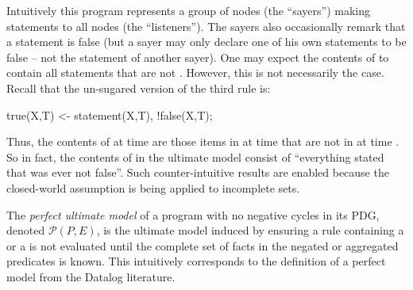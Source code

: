 Intuitively this program represents a group of nodes (the ``sayers'') making statements to all nodes (the ``listeners'').  The sayers also occasionally remark that a statement is false (but a sayer may only declare one of his own statements to be false -- not the statement of another sayer).  One may expect the contents of  to contain all statements that are not .  However, this is not necessarily the case.  Recall that the un-sugared version of the third rule is:

\begin{Dedalus}
true(X,T) <- statement(X,T), !false(X,T);
\end{Dedalus}

\noindent
Thus, the contents of  at time  are those items in  at time  that are not in  at time .  So in fact, the contents of  in the ultimate model consist of ``everything stated that was ever not false''.  Such counter-intuitive results are enabled because the closed-world assumption is being applied to incomplete sets.

\begin{definition}
The {\em perfect ultimate model} of a \lang program with no negative cycles in its PDG, denoted $\mathcal{P}(P, E)$, is the ultimate model induced by ensuring a rule containing a \dedalus{!} or a  is not evaluated until the complete set of facts in the negated or aggregated predicates is known.
This intuitively corresponds to the definition of a perfect model from the Datalog literature.
\end{definition}

